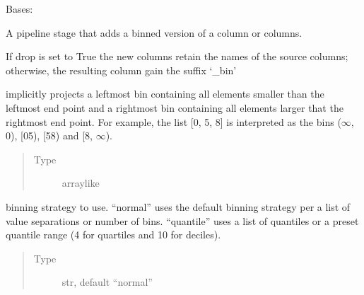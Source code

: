 \documentclass[letterpaper,10pt,english]{sphinxmanual}
\begin{document}

\begin{fulllineitems}
\label{\detokenize{dalio.pipe:dalio.pipe.Bin}}
Bases: {\hyperref[\detokenize{dalio.pipe:dalio.pipe.col_generation.Custom}]{}}

A pipeline stage that adds a binned version of a column or columns.

If drop is set to True the new columns retain the names of the source
columns; otherwise, the resulting column gain the suffix ‘\_bin’

\begin{fulllineitems}
\label{\detokenize{dalio.pipe:dalio.pipe.Bin.bin_map}}
implicitly projects a left\sphinxhyphen{}most bin containing
all elements smaller than the left\sphinxhyphen{}most end point and a right\sphinxhyphen{}most
bin containing all elements larger that the right\sphinxhyphen{}most end point.
For example, the list {[}0, 5, 8{]} is interpreted as
the bins (\sphinxhyphen{}\(\infty\), 0), {[}0\sphinxhyphen{}5), {[}5\sphinxhyphen{}8) and {[}8, \(\infty\)).
\begin{quote}\begin{description}
\item[{Type}] \leavevmode
array\sphinxhyphen{}like

\end{description}\end{quote}

\end{fulllineitems}


\begin{fulllineitems}
\label{\detokenize{dalio.pipe:dalio.pipe.Bin.bin_strat}}
binning strategy to use. “normal”
uses the default binning strategy per a list of value separations
or number of bins. “quantile” uses a list of quantiles or a
preset quantile range (4 for quartiles and 10 for deciles).
\begin{quote}\begin{description}
\item[{Type}] \leavevmode
str, default “normal”


\end{description}
\end{quote}
\end{fulllineitems}
\end{fulllineitems}
\end{document}
